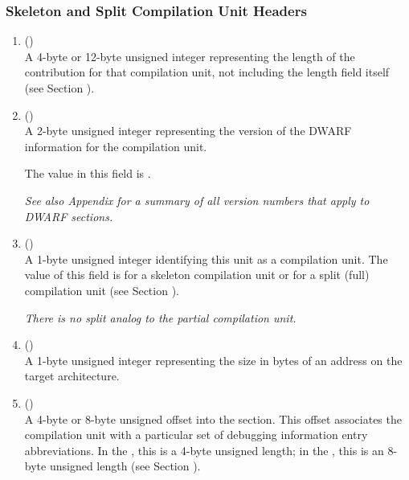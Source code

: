 \subsubsection{Skeleton and Split Compilation Unit Headers}
\label{datarep:skeletonandfullcompilationunitheaders}
\begin{enumerate}[1. ]

\item \HFNunitlength{} () \\
A 4-byte or 12-byte 
unsigned integer representing the length
of the \dotdebuginfo{}
contribution for that compilation unit,
not including the length field itself
\bb
(see Section ).
\eb

\item  \HFNversion{} (\HFTuhalf) \\
A 2-byte unsigned integer representing the version of the
DWARF information for the compilation unit.
 
The value in this field is \versiondotdebuginfo.

\textit{See also Appendix 
for a summary of all version numbers that apply to DWARF sections.}

\item \HFNunittype{} (\HFTubyte) \\
A 1-byte unsigned integer identifying this unit as a compilation unit.
The value of this field is 
\DWUTskeleton{} for a skeleton compilation unit or
\DWUTsplitcompile{} for a split (full) compilation unit
(see Section ).

\textit{There is no split analog to the partial compilation unit.}

\item \HFNaddresssize{} (\HFTubyte) \\
A 1-byte unsigned integer representing the size in bytes of
an address on the target architecture.
\db

\item \HFNdebugabbrevoffset{} () \\
A 
4-byte or 8-byte unsigned offset into the 
\dotdebugabbrev{}
section. This offset associates the compilation unit with a
particular set of debugging information entry abbreviations. In
the \thirtytwobitdwarfformat, this is a 4-byte unsigned length;
in the \sixtyfourbitdwarfformat, this is an 8-byte unsigned length
(see Section ).


\end{enumerate}
